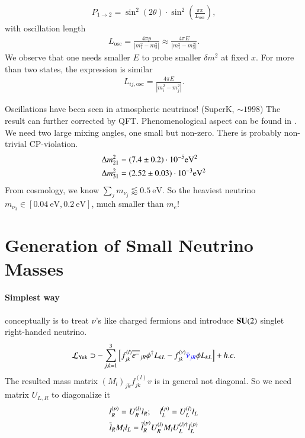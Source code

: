 \begin{align}
   P_{1\rightarrow 2} = \sin^2(2\theta) \cdot \sin^2 \left( \frac{\pi x}{L_\text{osc}} \right), \label{1.11}
\end{align}
with oscillation length
\begin{align*}
   L_\text{osc} = \frac{4\pi p}{ \left| m_1^2 - m_2^2 \right| } \approx \frac{4\pi E}{ \left| m_1^2 - m_2^2 \right| }.
\end{align*}
We observe that one needs smaller $E$ to probe smaller $\delta m^2$ at fixed $x$. For more than two states, the expression is similar 
\begin{align}
   L_{ij, \text{osc}} = \frac{4\pi E}{ \left| m_i^2 - m_j^2 \right| }. \label{1.13}
\end{align}

Oscillations have been seen in atmospheric neutrinos! (SuperK, $\sim 1998$) The result can further corrected by QFT\cite{Beuthe_2003}. Phenomenological aspect can be found in \cite{Esteban_2019}. We need two large mixing angles, one small but non-zero. There is probably non-trivial CP-violation.
\begin{align*}
   \Delta m^2_{21} &= (\num{7.4 +- 0.2}) \cdot 10^{-5} \si{\eV \tothe{2}} \\
   \Delta m^2_{31} &= (\num{2.52 +- 0.03})\cdot 10^{-3}\si{\eV \tothe{2}}
\end{align*}
From cosmology, we know $\sum_j m_{\nu_j} \lessapprox \SI{0.5}{\eV}$. So the heaviest neutrino  $m_{\nu_3} \in [\SI{0.04}{\eV}, \SI{0.2}{\eV}] $, much smaller than $m_e$!

\section{Generation of Small Neutrino Masses}
\paragraph{Simplest way}
conceptually is to treat $\nu$'s like charged fermions and introduce $\mathbf{SU}(2)$ singlet right-handed neutrino.
\begin{align}
   \mathcal{L}_{\text{Yuk}} \supset - \sum_{j,k=1}^{3} \left[ f^{(l)}_{jk} \overline{e^-}_{jR} \phi^\dagger L_{k L} - f^{(\nu)}_{jk} \textcolor{blue}{\bar{\nu}_{jR}} \phi L_{kL} \right] + h.c. \label{1.36}
\end{align}
The resulted mass matrix $(M_l)_{jk}f_{jk}^{(l)} v$ is in general not diagonal. So we need matrix $U_{L,R}$ to diagonalize it
\begin{align}
   l_R^{(p)} = U_R^{(l)}l_R; \quad l_L^{(p)} = U_L^{(l)}l_L  \notag \\
   \overline{l}_R M_l l_L = \overline{l}^{(p)}_R U^{(l)}_R M_l U^{(l)\dagger}_L l_L^{(p)} \label{1.37}
\end{align}

